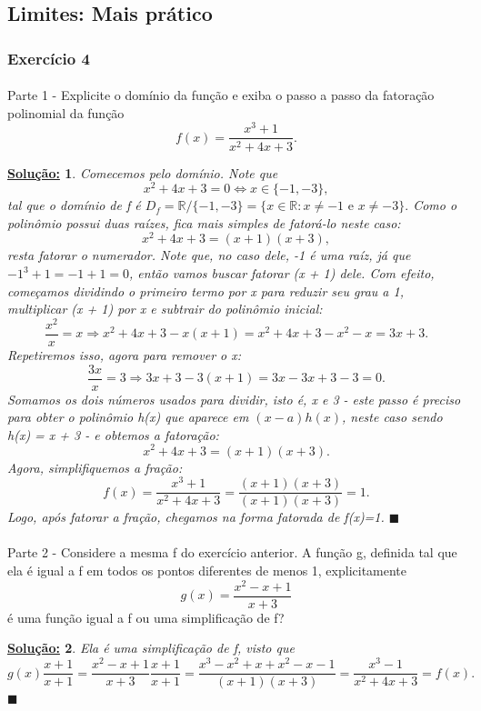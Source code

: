 \documentclass{article}
\newtheorem*{sol*}{\underline{Solu\c c\~ao:}}
\renewcommand\qedsymbol{$\blacksquare$}
\begin{document}
\subsection{Limites: Mais pr\'atico} 
\subsubsection{Exerc\'icio 4} 
\paragraph{} Parte 1 - Explicite o dom\'inio da fun\c c\~ao e exiba o passo a passo da fatora\c c\~ao polinomial da fun\c c\~ao
$$
f(x) = \frac{x^3 + 1}{x^2  + 4x + 3}.
$$
\begin{sol*}
Comecemos pelo dom\'inio. Note que 
$$
	x^2 + 4x + 3 = 0 \iff x\in\{-1, -3\},
$$
tal que o dom\'inio de f \'e $D_f = \mathbb{R}\slash\{-1, -3\} = \{x\in\mathbb{R}: x\neq{-1} \text{ e } x\neq{-3}\}.$ Como o polin\^omio possui duas ra\'izes, fica mais simples de fator\'a-lo neste caso:
$$
x^2 + 4x + 3 = (x + 1)(x + 3),
$$
resta fatorar o numerador. Note que, no caso dele, -1 \'e uma ra\'iz, j\'a que $-1^3 + 1 = -1 + 1 = 0$, ent\~ao vamos buscar fatorar (x + 1) dele. Com efeito, come\c camos dividindo o primeiro termo por x para reduzir seu grau a 1, multiplicar (x + 1) por x e subtrair do polin\^omio inicial:
$$
\frac{x^2}{x} = x \Rightarrow x^2 + 4x + 3 - x(x + 1) = x^2 + 4x + 3 - x^2 - x = 3x + 3.
$$
Repetiremos isso, agora para remover o x:
$$
\frac{3x}{x} = 3 \Rightarrow 3x + 3 - 3(x + 1) = 3x - 3x + 3 - 3 = 0.
$$
Somamos os dois n\'umeros usados para dividir, isto \'e, x e 3 - este passo \'e preciso para obter o polin\^omio h(x) que aparece em $(x - a)h(x)$, neste caso sendo h(x) = x + 3 - e obtemos a fatora\c c\~ao:
$$
x^2 + 4x + 3 = (x + 1)(x + 3).
$$
Agora, simplifiquemos a fra\c c\~ao:
$$
f(x) = \frac{x^3 + 1}{x^2  + 4x + 3} = \frac{(x + 1)(x + 3)}{(x + 1)(x + 3)} = 1.
$$
Logo, ap\'os fatorar a fra\c c\~ao, chegamos na forma fatorada de f(x)=1.
\qedsymbol
\end{sol*}

\paragraph{} Parte 2 - Considere a mesma f do exerc\'icio anterior. A fun\c c\~ao g, definida tal que ela \'e igual a f em todos os pontos diferentes de menos 1, explicitamente
$$
g(x) = \frac{x^2 - x + 1}{x + 3}
$$
\'e uma fun\c c\~ao igual a f ou uma simplifica\c c\~ao de f?
\begin{sol*}
Ela \'e uma simplifica\c c\~ao de f, visto que 
$$
g(x)\frac{x+1}{x+1} = \frac{x^2 - x + 1}{x + 3}\frac{x+1}{x+1} = \frac{x^3 - x^2 + x + x^2 - x - 1}{(x+1)(x+3)} = \frac{x^3 - 1}{x^2 + 4x + 3} = f(x).
$$
\qedsymbol
\end{sol*}
\end{document}

